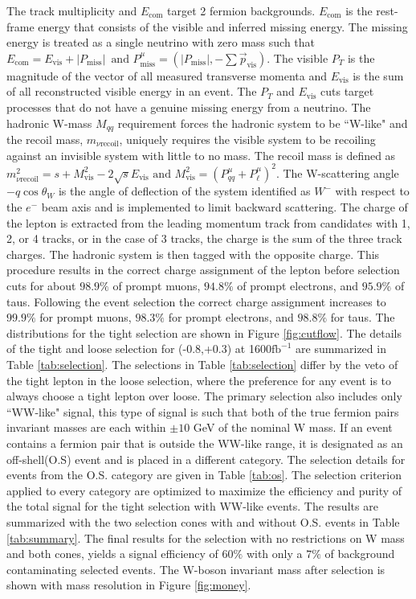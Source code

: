 The track multiplicity and $E_{\text{com}}$ target 2 fermion backgrounds. $E_{\text{com}}$ is the rest-frame energy that consists of the visible and inferred missing energy. The missing energy is treated as a single neutrino with zero mass such that $E_{\text{com}} = E_{\text{vis}} + |P_{\text{miss}}| \, \,  \, \text{and} \, \, P^\mu_{\text{miss}} = (|P_{\text{miss}}| , -\sum{\vec{p}_{\text{vis}}})$. The visible $P_T$ is the magnitude of the vector of all measured transverse momenta and $E_{\text{vis}}$ is the sum of all reconstructed visible energy in an event. The $P_T$ and $E_{\text{vis}}$ cuts target processes that do not have a genuine missing energy from a neutrino. The hadronic W-mass $M_{qq}$ requirement forces the hadronic system to be ``W-like" and the recoil mass, $m_{\nu \text{recoil}}$, uniquely requires the visible system to be recoiling against an invisible system with little to no mass. The recoil mass is defined as $m^2_{\nu \text{recoil}} = s + M^2_{\text{vis}} - 2\sqrt{s}E_{\text{vis}} \, \, \text{and} \, \, M^2_{\text{vis}} = ( P^{\mu}_{qq} +  P^{\mu}_{\ell})^2$. The W-scattering angle $-q\cos\theta_W$ is the angle of deflection of the system identified as $W^-$ with respect to the $e^-$ beam axis and is implemented to limit backward scattering.  The charge of the lepton is extracted from the leading momentum track from candidates with 1, 2, or 4 tracks, or in the case of 3 tracks, the charge is the sum of the three track charges. The hadronic system is then tagged with the opposite charge.  This procedure results in the correct charge assignment of the lepton before selection cuts for about $98.9\%$ of prompt muons, $94.8\%$ of prompt electrons, and $95.9\%$ of taus. Following the event selection the correct charge assignment increases to $99.9\%$ for prompt muons, $98.3\%$ for prompt electrons, and $98.8\%$ for taus. The distributions for the tight selection are shown in Figure \ref{fig:cutflow}. The details of the tight and loose selection for (-0.8,+0.3) at 1600$\text{fb}^{-1}$ are summarized in Table \ref{tab:selection}. The selections in Table \ref{tab:selection} differ by the veto of the tight lepton in the loose selection, where the preference for any event is to always choose a tight lepton over loose. The primary selection also includes only ``WW-like" signal, this type of signal is such that both of the true fermion pairs invariant masses are each within $\pm10$ GeV of the nominal W mass. If an event contains a fermion pair that is outside the WW-like range, it is designated as an off-shell(O.S) event and is placed in a different category. The selection details for events from the O.S. category are given in Table \ref{tab:os}. The selection criterion applied to every category are optimized to maximize the efficiency and purity of the total signal for the tight selection with WW-like events. The results are summarized with the two selection cones with and without O.S. events in Table \ref{tab:summary}. The final results for the selection with no restrictions on W mass and both cones, yields a signal efficiency of $60\%$ with only a $7\%$ of background contaminating selected events. The W-boson invariant mass after selection is shown with mass resolution in Figure \ref{fig:money}.


